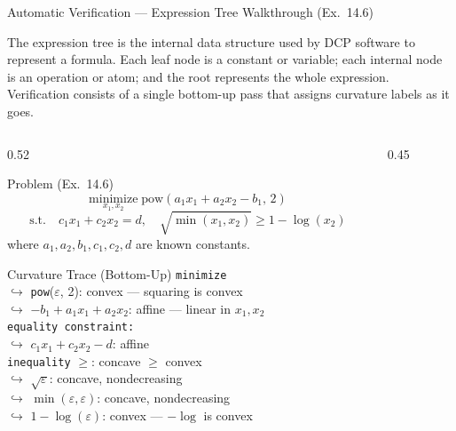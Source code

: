 \documentclass[aspectratio=169,10pt]{beamer}
\begin{document}
\begin{frame}[allowframebreaks]{Automatic Verification --- Expression Tree Walkthrough (Ex.\ 14.6)}

  The expression tree is the internal data structure used by DCP
  software to represent a formula.  Each leaf node is a constant or
  variable; each internal node is an operation or atom; and the root
  represents the whole expression.  Verification consists of a single
  bottom-up pass that assigns curvature labels as it goes.

  \begin{columns}
    \begin{column}{0.52\textwidth}
      \begin{exampleblock}{Problem (Ex.\ 14.6)}
        \small
        \[
          \underset{x_1,x_2}{\mathrm{minimize}}\;
          \mathrm{pow}(a_1 x_1 + a_2 x_2 - b_1,\,2)
        \]
        \[
          \text{s.t.}\quad c_1 x_1 + c_2 x_2 = d,\quad
          \sqrt{\min(x_1, x_2)} \geq 1 - \log(x_2)
        \]
        where $a_1, a_2, b_1, c_1, c_2, d$ are known constants.
      \end{exampleblock}
      \begin{block}{Curvature Trace (Bottom-Up)}
        \small
        \texttt{minimize}\\
        \quad$\hookrightarrow$ \texttt{pow}($\varepsilon$, 2):
          \textcolor{dcpblue}{convex} --- squaring is convex\\
        \quad\quad$\hookrightarrow$ $-b_1 + a_1 x_1 + a_2 x_2$:
          \textcolor{dcpblue}{affine} --- linear in $x_1, x_2$\\
        \texttt{equality constraint:}\\
        \quad$\hookrightarrow$ $c_1 x_1 + c_2 x_2 - d$:
          \textcolor{dcpblue}{affine} \checkmark\\
        \texttt{inequality} $\geq$: concave $\geq$ convex \checkmark\\
        \quad$\hookrightarrow$ $\sqrt{\varepsilon}$:
          \textcolor{dcpgreen}{concave, nondecreasing}\\
        \quad\quad$\hookrightarrow$ $\min(\varepsilon, \varepsilon)$:
          \textcolor{dcpgreen}{concave, nondecreasing}\\
        \quad$\hookrightarrow$ $1 - \log(\varepsilon)$:
          \textcolor{dcpred}{convex} --- $-\log$ is convex
      \end{block}
    \end{column}
    \begin{column}{0.45\textwidth}

\end{column}
\end{columns}
\end{frame}
\end{document}
